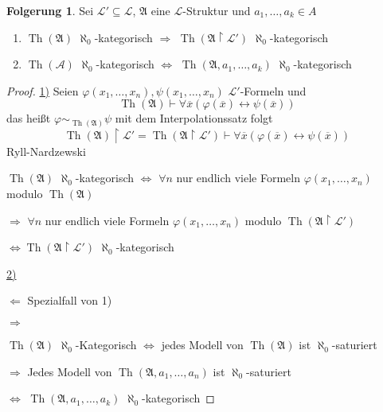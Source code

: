 \documentclass[12pt,parskip=full]{scrartcl}
\newcommand{\heading}{\underline}
\theoremstyle{definition}
\newtheorem{corollary}[theorem]{Folgerung}
\begin{document}
	\begin{corollary}
		Sei $\mathcal{L}' \subseteq \mathcal{L}$, $\mathfrak{A}$ eine $\mathcal{L}$-Struktur und $a_1, \dots, a_k \in A$
		\begin{enumerate}
			\item $\operatorname{Th}(\mathfrak{A})$ $\aleph_0$-kategorisch $\Rightarrow$ $\operatorname{Th}(\mathfrak{A} \upharpoonright \mathcal{L}')$ $\aleph_0$-kategorisch
			\item $\operatorname{Th}(\mathcal{A})$ $\aleph_0$-kategorisch $\Leftrightarrow$ $\operatorname{Th}(\mathfrak{A}, a_1, \dots, a_k)$ $\aleph_0$-kategorisch
		\end{enumerate}
	\end{corollary}

	\begin{proof}
		\heading{1)} Seien $\varphi(x_1, \dots, x_n), \psi(x_1, \dots, x_n)$ $\mathcal{L}'$-Formeln und
		\begin{equation*}
			\operatorname{Th}(\mathfrak{A}) \vdash \forall \overline{x} (\varphi(\overline{x}) \leftrightarrow \psi(\overline{x}))
		\end{equation*}
		das heißt $\varphi \sim_{\operatorname{Th}(\mathfrak{A})} \psi$
		mit dem Interpolationssatz folgt
		\begin{equation*}
			\operatorname{Th}(\mathfrak{A}) \upharpoonright \mathcal{L}' = \operatorname{Th}(\mathfrak{A} \upharpoonright \mathcal{L}') \vdash \forall \overline{x}(\varphi(\overline{x}) \leftrightarrow \psi(\overline{x}))
		\end{equation*}
		Ryll-Nardzewski
		
		$\operatorname{Th}(\mathfrak{A})$ $\aleph_0$-kategorisch $\Leftrightarrow$ $\forall n$ nur endlich viele Formeln $\varphi(x_1, \dots, x_n)$ modulo $\operatorname{Th}(\mathfrak{A})$
		
		$\Rightarrow$ $\forall n$ nur endlich viele Formeln $\varphi(x_1, \dots, x_n)$ modulo $\operatorname{Th}(\mathfrak{A} \upharpoonright \mathcal{L}')$
		
		$\Leftrightarrow \operatorname{Th}(\mathfrak{A} \upharpoonright \mathcal{L'})$ $\aleph_0$-kategorisch
		
		\heading{2)}
		
		\heading{$\Leftarrow$} Spezialfall von 1)
		
		\heading{$\Rightarrow$}
		
		$\operatorname{Th}(\mathfrak{A})$ $\aleph_0$-Kategorisch $\Leftrightarrow$ jedes Modell von $\operatorname{Th}(\mathfrak{A})$ ist $\aleph_0$-saturiert
		
		$\Rightarrow$ Jedes Modell von $\operatorname{Th}(\mathfrak{A}, a_1, \dots, a_n)$ ist $\aleph_0$-saturiert
		
		$\Leftrightarrow$ $\operatorname{Th}(\mathfrak{A}, a_1, \dots, a_k)$ $\aleph_0$-kategorisch
	\end{proof}
\end{document}
